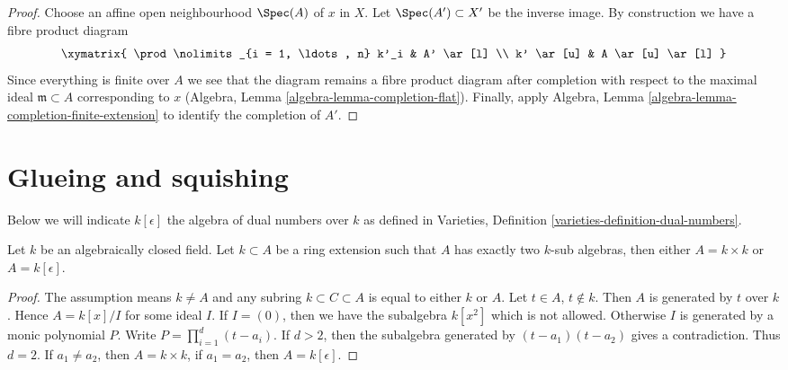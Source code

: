 \begin{proof}
Choose an affine open neighbourhood $\Spec(A)$ of $x$ in $X$.
Let $\Spec(A') \subset X'$ be the inverse image. By construction
we have a fibre product diagram
$$
\xymatrix{
\prod\nolimits_{i = 1, \ldots, n} k'_i &
A' \ar[l] \\
k' \ar[u] &
A \ar[u] \ar[l]
}
$$
Since everything is finite over $A$ we see that the diagram remains
a fibre product diagram after completion with respect to the
maximal ideal $\mathfrak m \subset A$ corresponding to $x$
(Algebra, Lemma \ref{algebra-lemma-completion-flat}).
Finally, apply Algebra, Lemma
\ref{algebra-lemma-completion-finite-extension}
to identify the completion of $A'$.
\end{proof}




\section{Glueing and squishing}
\label{section-glueing-squishing}

\noindent
Below we will indicate $k[\epsilon]$ the algebra of dual numbers
over $k$ as defined in
Varieties, Definition \ref{varieties-definition-dual-numbers}.

\begin{lemma}
\label{lemma-no-in-between-over-k}
Let $k$ be an algebraically closed field. Let $k \subset A$ be a ring
extension such that $A$ has exactly two $k$-sub algebras, then
either $A = k \times k$ or $A = k[\epsilon]$.
\end{lemma}

\begin{proof}
The assumption means $k \not = A$ and any subring $k \subset C \subset A$
is equal to either $k$ or $A$. Let $t \in A$, $t \not \in k$.
Then $A$ is generated by $t$ over $k$. Hence $A = k[x]/I$ for some
ideal $I$. If $I = (0)$, then we have the subalgebra $k[x^2]$
which is not allowed. Otherwise $I$ is generated by a monic polynomial $P$.
Write $P = \prod_{i = 1}^d (t - a_i)$. If $d > 2$, then the subalgebra
generated by $(t - a_1)(t - a_2)$ gives a contradiction.
Thus $d = 2$. If $a_1 \not = a_2$, then $A = k \times k$,
if $a_1 = a_2$, then $A = k[\epsilon]$.
\end{proof}

